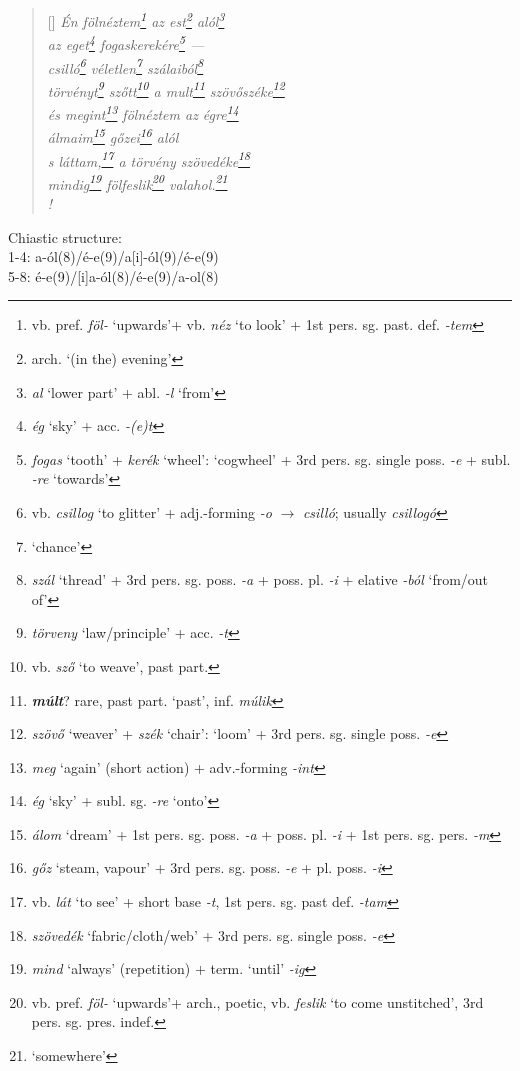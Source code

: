 \documentclass[a4paper,12pt,twoside,final]{book}
\begin{document}
\begin{verse}[\versewidth]
  \it
  Én fölnéztem\footnote{vb. pref. \emph{föl-} `upwards'+ vb.
  \emph{néz} `to look' + 1st pers. sg. past. def. \emph{-tem}} az
  est\footnote{arch. `(in the) evening'} alól\footnote{\emph{al}
  `lower part' + abl. \emph{-l} `from'} \\
  az eget\footnote{\emph{ég} `sky' + acc. \emph{-(e)t}}
  fogaskerekére\footnote{\emph{fogas} `tooth' +
  \emph{kerék} `wheel': `cogwheel' + 3rd pers. sg. single
  poss. \emph{-e} + subl. \emph{-re} `towards'} --- \\
  csilló\footnote{vb. \emph{csillog} `to glitter' +
  adj.-forming \emph{-o} $\rightarrow$
  \emph{csilló}; usually \emph{csillogó}}
  véletlen\footnote{`chance'} szálaiból\footnote{\emph{szál}
  `thread' + 3rd pers. sg. poss. \emph{-a} + poss. pl. \emph{-i} +
  elative \emph{-ból} `from/out of'} \\
  törvényt\footnote{\emph{törveny} `law/principle' + acc. \emph{-t}}
  szőtt\footnote{vb. \emph{sző} `to weave', past part.} a
  mult\footnote{\textbf{\emph{múlt}}? rare, past part. `past',
  inf. \emph{múlik}}
  szövőszéke\footnote{\emph{szövő} `weaver' + \emph{szék} `chair':
  `loom' + 3rd pers. sg. single poss. \emph{-e}} \\
  és megint\footnote{\emph{meg} `again' (short action) +
  adv.-forming \emph{-int}} fölnéztem az égre\footnote{\emph{ég}
  `sky' + subl. sg. \emph{-re} `onto'} \\
  álmaim\footnote{\emph{álom} `dream' +
  1st pers. sg. poss. \emph{-a} + poss. pl. \emph{-i} + 1st
  pers. sg. pers. \emph{-m}} gőzei\footnote{\emph{gőz} `steam,
  vapour' + 3rd pers. sg. poss. \emph{-e} + pl. poss. \emph{-i}} alól \\
  s láttam,\footnote{vb. \emph{lát} `to see' +
  short base \emph{-t}, 1st pers. sg. past def. \emph{-tam}} a törvény
  szövedéke\footnote{\emph{szövedék} `fabric/cloth/web' + 3rd
  pers. sg. single poss. \emph{-e}} \\
  mindig\footnote{\emph{mind} `always' (repetition) + term. `until'
  \emph{-ig}} fölfeslik\footnote{vb. pref. \emph{föl-} `upwards'+
  arch., poetic, vb.
  \emph{feslik} `to come unstitched', 3rd pers. sg. pres. indef.}
  valahol.\footnote{`somewhere'} \\!
\end{verse}

\noindent Chiastic structure: \\
1-4: a-ól(8)/é-e(9)/a[i]-ól(9)/é-e(9) \\
5-8: é-e(9)/[i]a-ól(8)/é-e(9)/a-ol(8)
\end{document}

